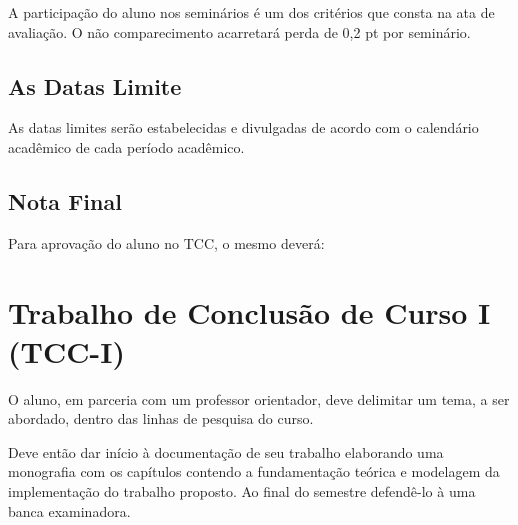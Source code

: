 A participação do aluno nos seminários é um dos critérios que consta na ata de avaliação. O não comparecimento acarretará perda de 0,2 pt por seminário.


\subsection{As Datas Limite}

As datas limites serão estabelecidas e divulgadas de acordo com o calendário acadêmico de cada período acadêmico.


\subsection{Nota Final}

Para aprovação do aluno no TCC, o mesmo deverá:



\section{Trabalho de Conclusão de Curso I (TCC-I)}

O aluno, em parceria com um professor orientador, deve delimitar um tema, a ser abordado, dentro das linhas de pesquisa do curso.

Deve então dar início à documentação de seu trabalho elaborando uma monografia com os capítulos contendo a fundamentação teórica e modelagem da implementação do trabalho proposto. Ao final do semestre defendê-lo à uma banca examinadora.

